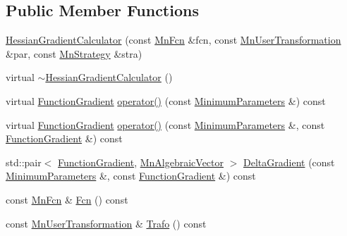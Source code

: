 \subsection*{Public Member Functions}
\begin{DoxyCompactItemize}
\item 
\mbox{\hyperlink{classROOT_1_1Minuit2_1_1HessianGradientCalculator_af298f780f59cb2be1ac5e676af07f82b}{Hessian\+Gradient\+Calculator}} (const \mbox{\hyperlink{classROOT_1_1Minuit2_1_1MnFcn}{Mn\+Fcn}} \&fcn, const \mbox{\hyperlink{classROOT_1_1Minuit2_1_1MnUserTransformation}{Mn\+User\+Transformation}} \&par, const \mbox{\hyperlink{classROOT_1_1Minuit2_1_1MnStrategy}{Mn\+Strategy}} \&stra)
\item 
virtual \mbox{\hyperlink{classROOT_1_1Minuit2_1_1HessianGradientCalculator_abb91fad11c0bbff5199e4da1f03b1fb3}{$\sim$\+Hessian\+Gradient\+Calculator}} ()
\item 
virtual \mbox{\hyperlink{classROOT_1_1Minuit2_1_1FunctionGradient}{Function\+Gradient}} \mbox{\hyperlink{classROOT_1_1Minuit2_1_1HessianGradientCalculator_ada968380aae7c1c6b6d0716d6a9804b5}{operator()}} (const \mbox{\hyperlink{classROOT_1_1Minuit2_1_1MinimumParameters}{Minimum\+Parameters}} \&) const
\item 
virtual \mbox{\hyperlink{classROOT_1_1Minuit2_1_1FunctionGradient}{Function\+Gradient}} \mbox{\hyperlink{classROOT_1_1Minuit2_1_1HessianGradientCalculator_ae8832c265494484c65aed77f023b843f}{operator()}} (const \mbox{\hyperlink{classROOT_1_1Minuit2_1_1MinimumParameters}{Minimum\+Parameters}} \&, const \mbox{\hyperlink{classROOT_1_1Minuit2_1_1FunctionGradient}{Function\+Gradient}} \&) const
\item 
std\+::pair$<$ \mbox{\hyperlink{classROOT_1_1Minuit2_1_1FunctionGradient}{Function\+Gradient}}, \mbox{\hyperlink{namespaceROOT_1_1Minuit2_a62ed97730a1ca8d3fbaec64a19aa11c9}{Mn\+Algebraic\+Vector}} $>$ \mbox{\hyperlink{classROOT_1_1Minuit2_1_1HessianGradientCalculator_ace21cdfb201391d53a015e373977c2d1}{Delta\+Gradient}} (const \mbox{\hyperlink{classROOT_1_1Minuit2_1_1MinimumParameters}{Minimum\+Parameters}} \&, const \mbox{\hyperlink{classROOT_1_1Minuit2_1_1FunctionGradient}{Function\+Gradient}} \&) const
\item 
const \mbox{\hyperlink{classROOT_1_1Minuit2_1_1MnFcn}{Mn\+Fcn}} \& \mbox{\hyperlink{classROOT_1_1Minuit2_1_1HessianGradientCalculator_ae23f4348f9a64595c39db48aa48d9e09}{Fcn}} () const
\item 
const \mbox{\hyperlink{classROOT_1_1Minuit2_1_1MnUserTransformation}{Mn\+User\+Transformation}} \& \mbox{\hyperlink{classROOT_1_1Minuit2_1_1HessianGradientCalculator_a4b122eecb0217cab813601572ccbac74}{Trafo}} () const

\end{DoxyCompactItemize}
